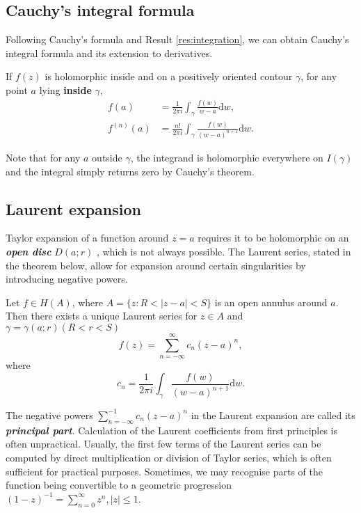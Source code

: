 \documentclass{article}
\begin{document}
\subsection{Cauchy's integral formula}
Following Cauchy's formula and Result \ref{res:integration}, we can obtain Cauchy's integral formula and its extension to derivatives.
\begin{frm-thm}
    If $f(z)$ is holomorphic inside and on a positively oriented contour $\gamma$, for any point $a$ lying \textbf{inside}  $\gamma$,
    \[
        \begin{aligned}
            f(a) &= \frac{1}{2\pi i} \int_\gamma \frac{f(w)}{w-a} \mathrm{d}w, \\
            f^{(n)}(a) &= \frac{n!}{2\pi i } \int_\gamma \frac{f(w)}{(w-a)^{n+1}} \mathrm{d}w.
        \end{aligned}
    \]
\end{frm-thm}
Note that for any $a$ outside $\gamma $, the integrand is holomorphic everywhere on $I(\gamma) $ and the integral simply returns zero by Cauchy's theorem. 
\subsection{Laurent expansion}
Taylor expansion of a function around $z=a$ requires it to be holomorphic on an \textit{\textbf{open disc}} $D(a;r)$ , which is not always possible. The Laurent series, stated in the theorem below, allow for expansion around certain singularities by introducing negative powers. 
\begin{frm-thm}
    Let $f \in H(A)$, where $A=\{z:R< \left\vert z-a \right\vert <S\}$ is an open annulus around $a$. Then there exists a unique Laurent series for $z \in A$ and $\gamma = \gamma (a;r) (R<r<S)$
    \[
        f(z) = \sum_{n=-\infty }^{\infty} c_n (z-a)^n,   
    \]
    where 
    \[
        c_n = \frac{1}{2\pi i} \int_\gamma \frac{f(w)}{(w-a)^{n+1} }\mathrm{d}w.
    \]
\end{frm-thm}
The negative powers $\sum_{n=-\infty }^{-1} c_n (z-a)^n$ in the Laurent expansion are called its \textit{\textbf{principal part}}. Calculation of the Laurent coefficients from first principles is often unpractical. Usually, the first few terms of the Laurent series can be computed by direct multiplication or division of Taylor series, which is often sufficient for practical purposes. Sometimes, we may recognise parts of the function being convertible to a geometric progression $({1-z})^{-1}  = \sum_{n=0}^{\infty} z^n , \left\vert z \right\vert \leq 1$. 
\end{document}
